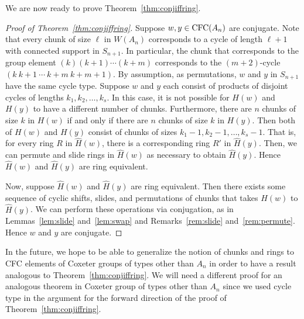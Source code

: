     We are now ready to prove Theorem~\ref{thm:conjiffring}.

\begin{proof}[Proof of Theorem~\ref{thm:conjiffring}] Suppose $w,y \in \operatorname{\mathrm{CFC}}(A_n)$ are conjugate.
    Note that every chunk of size $\ell$ in $W(A_n)$ corresponds to a cycle of length $\ell+1$ with connected support in $S_{n+1}$.
    In particular, the chunk that corresponds to the group element $(k)(k+1) \cdots (k+m)$ corresponds to the $(m+2)$-cycle $(k~k+1~ \cdots ~ k+m~k+m+1)$.
    By assumption, as permutations, $w$ and $y$ in $S_{n+1}$ have the same cycle type. Suppose $w$ and $y$ each consist of products of disjoint cycles of lengths $k_{1}, k_{2}, \ldots, k_{s}$. In this case, it is not possible for $H(w)$ and $H(y)$ to have a different number of chunks. Furthermore, there are $n$ chunks of size $k$ in $H(w)$ if and only if there are $n$ chunks of size $k$ in $H(y)$. 
    Then both of $H(w)$ and $H(y)$ consist of chunks of sizes $k_{1}-1,k_{2}-1,\ldots,k_{s}-1$. That is, for every ring $R$ in $\hat{H}(w)$, there is a corresponding ring $R'$ in $\hat{H}(y)$. Then, we can permute and slide rings in $\hat{H}(w)$ as necessary to obtain $\hat{H}(y)$.
    Hence $\hat{H}(w)$ and $\hat{H}(y)$ are ring equivalent.

    Now, suppose $\hat{H}(w)$ and $\hat{H}(y)$ are ring equivalent. Then there exists some sequence of cyclic shifts, slides, and permutations of chunks that takes $\hat{H}(w)$ to $\hat{H}(y)$. We can perform these operations via conjugation, as in Lemmas~\ref{lem:slide} and~\ref{lem:swap} and Remarks~\ref{rem:slide} and~\ref{rem:permute}. Hence $w$ and $y$ are conjugate.
\end{proof}

    In the future, we hope to be able to generalize the notion of chunks and rings to CFC elements of Coxeter groups of types other than $A_n$ in order to have a result analogous to Theorem~\ref{thm:conjiffring}.
    We will need a different proof for an analogous theorem in Coxeter group of types other than $A_n$ since we used cycle type in the argument for the forward direction of the proof of Theorem~\ref{thm:conjiffring}.



